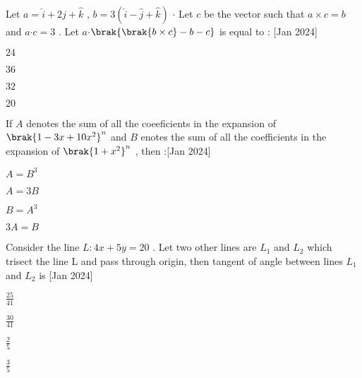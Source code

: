 \item Let $a=\hat{i}+2\hat{j}+\hat{k}$ , $b=3(\hat{i}-\hat{j}+\hat{k})$ $\cdot$ Let $c$ be the vector such that $a \times c=b$ and $a$$\cdot$$c=3$ . Let $a$$\cdot$$\brak{\brak{b \times c}-b-c}$ is equal to : \hfill{[Jan 2024]}
\begin{enumerate}   
\begin{multicols}{4}
\item $24$
\item $36$ 
\item $32$ 
\item $20$                                                                  
\end{multicols}
\end{enumerate}
\item If $A$ denotes the sum of all the coeeficients in the expansion of $\brak{1-3x+10x^2}^{n}$ and $B$ enotes the sum of all the coefficients in the expansion of $\brak{1+x^2}^{n}$ , then :\hfill{[Jan 2024]}
\begin{enumerate}
\begin{multicols}{4}
\item $ A=B^3 $
\item $ A=3B $
\item $ B=A^3 $
\item $ 3A=B $
\end{multicols}
\end{enumerate}
\item Consider the line $L:4x+5y=20$ . Let two other lines are $L_1$ and $L_2$ which trisect the line L and pass through origin, then tangent of angle between lines $L_1$ and $L_2$ is \hfill{[Jan 2024]}
\begin{enumerate}
\begin{multicols}{4}
\item $ \frac{25}{41} $
\item $ \frac{30}{41} $
\item $ \frac{2}{5} $
\item $ \frac{3}{5} $
\end{multicols}
\end{enumerate}
